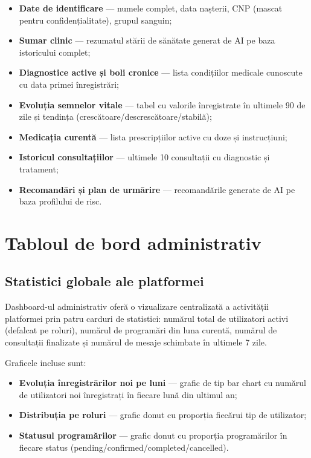 \begin{itemize}
  \item \textbf{Date de identificare} --- numele complet, data nașterii, CNP (mascat pentru confidențialitate), grupul sanguin;
  \item \textbf{Sumar clinic} --- rezumatul stării de sănătate generat de AI pe baza istoricului complet;
  \item \textbf{Diagnostice active și boli cronice} --- lista condițiilor medicale cunoscute cu data primei înregistrări;
  \item \textbf{Evoluția semnelor vitale} --- tabel cu valorile înregistrate în ultimele 90 de zile și tendința (crescătoare/descrescătoare/stabilă);
  \item \textbf{Medicația curentă} --- lista prescripțiilor active cu doze și instrucțiuni;
  \item \textbf{Istoricul consultațiilor} --- ultimele 10 consultații cu diagnostic și tratament;
  \item \textbf{Recomandări și plan de urmărire} --- recomandările generate de AI pe baza profilului de risc.
\end{itemize}

\section{Tabloul de bord administrativ}

\subsection{Statistici globale ale platformei}

Dashboard-ul administrativ oferă o vizualizare centralizată a activității platformei prin patru carduri de statistici: numărul total de utilizatori activi (defalcat pe roluri), numărul de programări din luna curentă, numărul de consultații finalizate și numărul de mesaje schimbate în ultimele 7 zile.

Graficele incluse sunt:
\begin{itemize}
  \item \textbf{Evoluția înregistrărilor noi pe luni} --- grafic de tip bar chart cu numărul de utilizatori noi înregistrați în fiecare lună din ultimul an;
  \item \textbf{Distribuția pe roluri} --- grafic donut cu proporția fiecărui tip de utilizator;
  \item \textbf{Statusul programărilor} --- grafic donut cu proporția programărilor în fiecare status (pending/confirmed/completed/cancelled).
\end{itemize}

